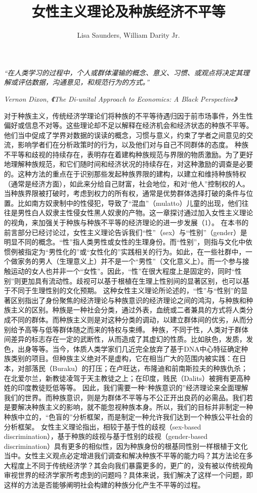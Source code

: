 \documentclass[UTF8]{ctexart}
\title{女性主义理论及种族经济不平等}
\author{Lisa Saunders, William Darity Jr.}
\begin{document}
\maketitle


\textit{“在人类学习的过程中，个人或群体灌输的概念、意义、习惯、或观点将决定其理解或评估数据，沟通意见，和规范行为的方式。”}


\textit{Vernon Dixon, 《The Di-unital Approach to Economics: A Black Perspective》}




对于种族主义，传统经济学理论们将种族的不平等待遇归因于前市场事件，外生性偏好或信息不对等。这些理论却不足以解释在经济机会和经济状态的种族不平等。他们当中促成了学界对数据的误读的概念，习惯与意义，约束了学者之间意见的交流，影响学者们在分析政策时的行为，以及他们对与自己不同群体的态度。
种族不平等和歧视的持续存在，表明存在着建构种族规范与界限的物质激励。为了更好地理解种族规范，和它们随时间和经济状况的持续存在，对这种激励的调查是必要的。这种方法的重点在于识别那些发起种族界限的建构，以建立和维持种族特权（通常是经济方面），如此来分给自己财富，社会地位，和对“他人”控制权的人。当种族界限被打破时，考虑到权力的所有权，通常是优势群体选择打破的条件与位置。比如南方奴隶制中的性侵犯，导致了“混血”（mulatto）儿童的出现，他们往往是男性白人奴隶主性侵女性黑人奴隶的产物。这一章探讨通过加入女性主义理论的视角，来加强关于种族与种族不平等的经济理论的进一步发展（1）。
在本书的前言部分已经讨论过，女性主义理论告诉我们“性”（sex）与“性别”（gender）是明显不同的概念。“性”指人类男性或女性的生理身份。而“性别”，则指与文化中依惯例被指定为“男性化的”或“女性化的”实践相关的行为。如此，在一些社群中，一个做家务的男人（生理意义上）并不是一个“男性”（文化意义上）。而一个参与接触运动的女人也并非一个“女性”。因此，“性”在很大程度上是固定的，同时“性别”则更加具有流动性。歧视可以基于根植在生理上性别间的显著区别，也可以基于不同于生理性别的文化预期。
这种女性主义理论所论述的，“性”与“性别”的显著区别指出了身份聚焦的经济理论与种族意识的经济理论之间的鸿沟，与种族和种族主义的区别。种族是一种社会分类，通过外表，血统或二者兼具的方式将人类分成不同的群体。而种族主义则是对这种分类的调动，以建立群体间的优劣，从而分别给予高等与低等群体随之而来的特权与束缚。
种族，不同于性，人类对于群体间差异的标志存在一定的武断性，从而造成了其虚幻的性质。比如肤色，发质，发色，出身等等。当今，体质人类学家们几近完全放弃了基于DNA中心特征确定种族类别的项目。但种族主义绝对不是虚构，它在相当广大的范围内被实践：在日本，对部落民（Buraku）的打压；在卢旺达，布隆迪和前南斯拉夫的种族仇杀；在北爱尔兰，新教徒凌驾于天主教徒之上；在印度，贱民（Dalits）被拥有更高种姓的印度教徒贬低等等。
因此，我们需要一种“种族意识的”经济理论来全面理解我们的世界。而种族意识，则是为群体不平等与不公正开出良药的必需品。我们若是要解决种族主义的影响，就不能忽视种族本身。所以，我们的目标并非制定一种种族中立的，“色盲的”分析框架，而是制定一种允许我们达到一个种族公平社会的分析框架。
女性主义理论指出，相较于基于性的歧视（sex-based discrimination），基于种族的歧视与基于性别的歧视（gender-based discrimination）具有更多的相似性，因为种族身份的根基同性别一样根植于文化当中。女性主义观点必定增进我们调查和解决种族不平等的能力吗？其方法论在多大程度上不同于传统经济学？其会向我们暴露更多的，更广的，没有被以传统视角审视世界的经济学家所考虑到的问题吗？具体来说，我们解决了这样一个问题，即这样的方法是否能够阐明社会构建的种族分化产生不平等的过程。
\end{document}
